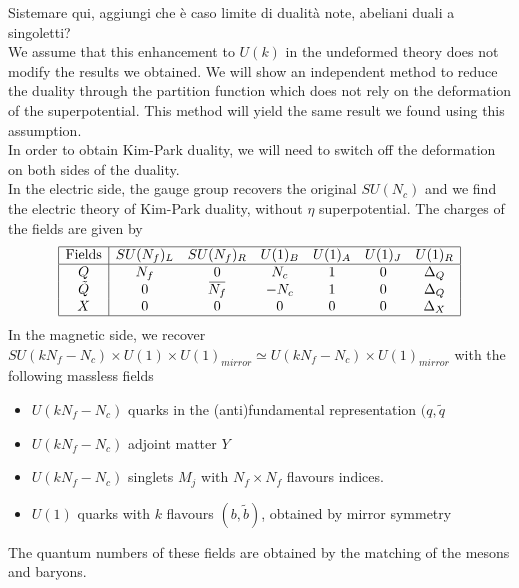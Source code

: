 {\Huge Sistemare qui, aggiungi che è caso limite di dualità note, abeliani duali a singoletti?}
\\
We assume that this enhancement to $U(k)$ in the undeformed theory does not modify the results we obtained. 
We will show an independent method to reduce the duality through the partition function which does not rely on the deformation of the superpotential.
This method will yield the same result we found using this assumption.
\\
In order to obtain Kim-Park duality, we will need to switch off the deformation on both sides of the duality.\\
In the electric side, the gauge group recovers the original $SU(N_c)$ and we find the electric theory of Kim-Park duality, without $\eta$ superpotential.
The charges of the fields are given by
\begin{equation}
\begin{array}{| c | c c c c c c | }
\hline
\hbox{Fields} & SU(N_f)_L & SU(N_f)_R & U(1)_B & U(1)_A & U(1)_J & U(1)_R  \\
\hline
Q & N_f & 0  & N_c & 1 & 0  & \Delta_Q \\
\tilde{Q}   & 0  &\overbar{N_f} &  - N_c & 1  & 0 & \Delta_Q \\
X & 0 & 0 & 0 & 0 &0 & \Delta_X \\
\hline
\end{array}
\end{equation}
In the magnetic side, we recover $SU(k N_f - N_c) \times U(1) \times U(1)_{mirror} \simeq U(k N_f - N_c) \times U(1)_{mirror}$ with the following massless fields
\begin{itemize}
\item $U(k N_f - N_c)$ quarks in the (anti)fundamental representation $(q,\tilde{q}$
\item $U(k N_f - N_c)$ adjoint matter $Y$
\item $U(k N_f - N_c)$ singlets $M_j$ with $N_f \times N_f$ flavours indices.
\item $U(1) $ quarks with $k$ flavours $(b,\tilde{b})$, obtained by mirror symmetry 
\end{itemize}
The quantum numbers of these fields are obtained by the matching of the mesons and baryons.\\
